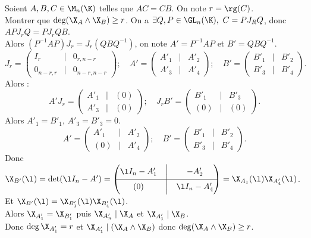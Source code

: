 \documentclass[11pt]{article}
\begin{document}
\pagebreak

\begin{exercice}{}{}
    Soient $A,B,C\in\M_n(\K)$ telles que $AC=CB$. On note $r=\rg(C)$.\\
    Montrer que $\deg(\X_A\land\X_B)\geq r$.
    \tcblower
    On a $\exists Q,P \in \GL_n(\K), ~ C=PJ_RQ$, donc $APJ_rQ=PJ_rQB$.\\
    Alors $(P^{-1}AP)J_r = J_r(QBQ^{-1})$, on note $A'=P^{-1}AP$ et $B'=QBQ^{-1}$.
    \begin{equation*}
        J_r = \begin{pmatrix}I_r & \Big| & 0_{r,n-r} \\ \hline 0_{n-r,r} & \Big| & 0_{n-r,n-r}\end{pmatrix}; \quad A' = \begin{pmatrix}A'_1 & \Big| & A'_2 \\ \hline A'_3 & \Big| & A'_4\end{pmatrix}; \quad B'=\begin{pmatrix} B'_1 & \Big| & B'_2 \\ \hline B'_3 & \Big| & B'_4\end{pmatrix}.
    \end{equation*}
    Alors :
    \begin{equation*}
        A'J_r = \begin{pmatrix}A'_1 & \Big| & (0) \\ \hline A'_3 & \Big| & (0)\end{pmatrix}; \quad J_rB' = \begin{pmatrix}B'_1 & \Big| & B'_3 \\ \hline (0) & \Big| & (0)\end{pmatrix}.
    \end{equation*}
    Alors $A'_1 = B'_1$, $A'_3 = B'_3=0$.
    \begin{equation*}
        A' = \begin{pmatrix}A'_1 & \Big| & A'_2 \\ \hline (0) & \Big| & A'_4 \end{pmatrix}; \quad B' = \begin{pmatrix}B'_1 & \Big| & B'_2 \\ \hline B'_3 & \Big| & B'_4\end{pmatrix}.
    \end{equation*}
    Donc $\X_{B'}(\l) = \det(\l I_n - A') = \begin{pmatrix}\l I_n - A_1' & \Big| & -A'_2 \\ \hline (0) & \Big| & \l I_n - A'_4\end{pmatrix}=\X_{A_1}(\l)\X_{A'_4}(\l)$.\\
    Et $\X_{B'}(\l)=\X_{B'_1}(\l)\X_{B'_4}(\l)$.\\
    Alors $\X_{A'_1}=\X_{B'_1}$ puis $\X_{A_n'} \mid \X_A$ et $\X_{A'_1} \mid \X_B$.\\
    Donc $\deg \X_{A_1'}=r$ et $\X_{A'_1} \mid (\X_A \land \X_B)$ donc $\deg(\X_A \land \X_B)\geq r$.
\end{exercice}
\end{document}
